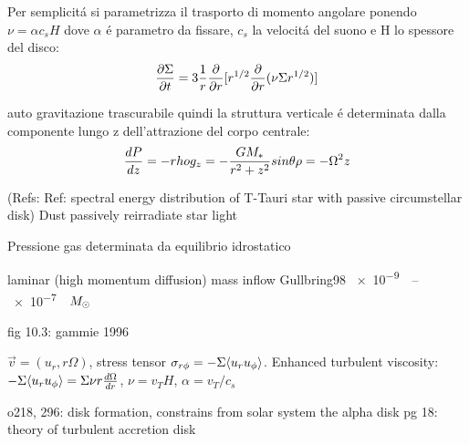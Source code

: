 Per semplicit\'a si parametrizza il trasporto di momento angolare ponendo $\nu=\alpha c_s H$ dove $\alpha$ \'e parametro da fissare, $c_s$ la velocit\'a del suono e H lo spessore del disco:
\begin{equation}
\PDy{t}{\Sigma}=3\frac{1}{r}\PDof{r}[r\expy{1/2}\PDof{r}(\nu\Sigma r\expy{1/2})]\label{eq:sigmaevol}
\end{equation}

auto gravitazione trascurabile quindi la struttura verticale \'e determinata dalla componente lungo z dell'attrazione del corpo centrale:
\begin{equation}
\TDy{z}{P}=-rho g_z=-\frac{GM_*}{r^2+z^2}sin{\theta}\rho=-\Omega^2z
\end{equation}

\begin{workout}
(Refs: Ref: spectral energy distribution of T-Tauri star with passive circumstellar disk)
Dust passively reirradiate star light
\end{workout}

\begin{workout}
Pressione gas determinata da equilibrio idrostatico
\end{workout}

\begin{workout}
laminar (high momentum diffusion)
mass inflow Gullbring98 \SIrange{e-9}{e-7}{\per\year}$\msun{}$
\end{workout}
\begin{workout}[MRI]
fig 10.3:
gammie 1996
\end{workout}

\begin{workout}
$\vec{v}=(u_r,r\Omega)$, stress tensor $\sigma_{r\phi}=-\Sigma\exv{u_ru_{\phi}}$.
Enhanced turbulent viscosity: $-\Sigma\exv{u_ru_{\phi}}=\Sigma\nu r\TDy{r}{\Omega}$, $\nu=v_TH$, $\alpha=v_T/c_s$
\end{workout}

\begin{workout}
o218, 296: disk formation, constrains from solar system
the alpha disk pg 18: theory of turbulent accretion disk
\end{workout}

\begin{workout}

\end{workout}

